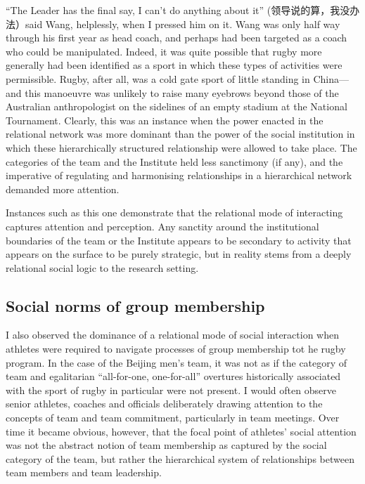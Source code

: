 \begin{CJK}{UTF8}{gbsn}
``The Leader has the final say, I can't do anything about it'' (领导说的算，我没办法）said Wang, helplessly, when I pressed him on it.  Wang was only half way through his first year as head coach, and perhaps had been targeted as a coach who could be manipulated.  Indeed, it was quite possible that rugby more generally had been identified as a sport in which these types of activities were permissible.  Rugby, after all, was a cold gate sport of little standing in China---and this manoeuvre was unlikely to raise many eyebrows beyond those of the Australian anthropologist on the sidelines of an empty stadium at the National Tournament.  Clearly, this was an instance when the power enacted in the relational network was more dominant than the power of the social institution in which these hierarchically structured relationship were allowed to take place.  The categories of the team and the Institute held less sanctimony (if any), and the imperative of regulating and harmonising relationships in a hierarchical network demanded more attention.

Instances such as this one demonstrate that the relational mode of interacting captures attention and perception. Any sanctity around the institutional boundaries of the team or the Institute appears to be secondary to activity that appears on the surface to be purely strategic, but in reality stems from a deeply relational social logic to the research setting.


\subsection{Social norms of group membership \label{sect:groupMembership}}

I also observed the dominance of a relational mode of social interaction when athletes were required to navigate processes of group membership tot he rugby program.  In the case of the Beijing men's team, it was not as if the category of team and egalitarian ``all-for-one, one-for-all'' overtures historically associated with the sport of rugby in particular were not present.  I would often observe senior athletes, coaches and officials deliberately drawing attention to the concepts of team and team commitment, particularly in team meetings.  Over time it became obvious, however, that the focal point of athletes' social attention was not the abstract notion of team membership as captured by the social category of the team, but rather the hierarchical system of relationships between team members and team leadership.


\end{CJK}
